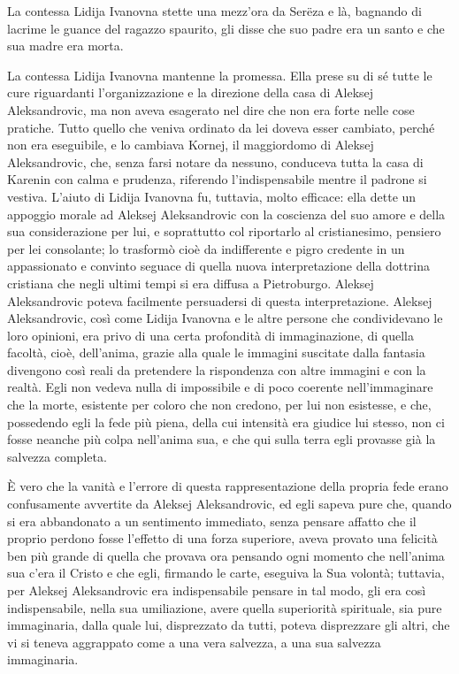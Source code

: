 La contessa Lidija Ivanovna stette una mezz'ora da Serëza e là, bagnando di lacrime le guance del ragazzo spaurito, gli disse che suo padre era un santo e che sua madre era morta. 

La contessa Lidija Ivanovna mantenne la promessa. Ella prese su di sé tutte le cure riguardanti l'organizzazione e la direzione della casa di Aleksej Aleksandrovic, ma non aveva esagerato nel dire che non era forte nelle cose pratiche. Tutto quello che veniva ordinato da lei doveva esser cambiato, perché non era eseguibile, e lo cambiava Kornej, il maggiordomo di Aleksej Aleksandrovic, che, senza farsi notare da nessuno, conduceva tutta la casa di Karenin con calma e prudenza, riferendo l'indispensabile mentre il padrone si vestiva. L'aiuto di Lidija Ivanovna fu, tuttavia, molto efficace: ella dette un appoggio morale ad Aleksej Aleksandrovic con la coscienza del suo amore e della sua considerazione per lui, e soprattutto col riportarlo al cristianesimo, pensiero per lei consolante; lo trasformò cioè da indifferente e pigro credente in un appassionato e convinto seguace di quella nuova interpretazione della dottrina cristiana che negli ultimi tempi si era diffusa a Pietroburgo. Aleksej Aleksandrovic poteva facilmente persuadersi di questa interpretazione. Aleksej Aleksandrovic, così come Lidija Ivanovna e le altre persone che condividevano le loro opinioni, era privo di una certa profondità di immaginazione, di quella facoltà, cioè, dell'anima, grazie alla quale le immagini suscitate dalla fantasia divengono così reali da pretendere la rispondenza con altre immagini e con la realtà. Egli non vedeva nulla di impossibile e di poco coerente nell'immaginare che la morte, esistente per coloro che non credono, per lui non esistesse, e che, possedendo egli la fede più piena, della cui intensità era giudice lui stesso, non ci fosse neanche più colpa nell'anima sua, e che qui sulla terra egli provasse già la salvezza completa. 

È vero che la vanità e l'errore di questa rappresentazione della propria fede erano confusamente avvertite da Aleksej Aleksandrovic, ed egli sapeva pure che, quando si era abbandonato a un sentimento immediato, senza pensare affatto che il proprio perdono fosse l'effetto di una forza superiore, aveva provato una felicità ben più grande di quella che provava ora pensando ogni momento che nell'anima sua c'era il Cristo e che egli, firmando le carte, eseguiva la Sua volontà; tuttavia, per Aleksej Aleksandrovic era indispensabile pensare in tal modo, gli era così indispensabile, nella sua umiliazione, avere quella superiorità spirituale, sia pure immaginaria, dalla quale lui, disprezzato da tutti, poteva disprezzare gli altri, che vi si teneva aggrappato come a una vera salvezza, a una sua salvezza immaginaria. 

